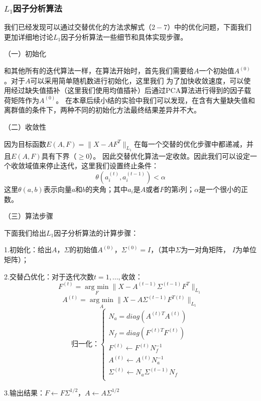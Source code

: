 \subsubsection{$L_1$因子分析算法}
我们已经发现可以通过交替优化的方法求解式（$2-7$）中的优化问题，下面我们更加详细地讨论$L_1$因子分析算法一些细节和具体实现步骤。

（一）初始化

和其他所有的迭代算法一样，在算法开始时，首先我们需要给$A$一个初始值$A^{(0)}$。对于$A$可以采用简单随机数进行初始化，这里我们
为了加快收敛速度，可以使用经过缺失值插补（这里我们使用均值插补）后通过PCA算法进行得到的因子载荷矩阵作为$A^{(0)}$。
在本章后续小结的实验中我们可以发现，在含有大量缺失值和离群值的条件下，两种不同的初始化方法最终结果差异并不大。

（二）收敛性

因为目标函数$E(A, F) = \|X - AF^T\|_{L_1}$在每一个交替的优化步骤中都递减，并且$E(A,F)$具有下界（$\geq 0$）。
因此交替优化算法一定收敛。因此我们可以设定一个收敛域值来停止迭代，这里我们设置终止条件：
    $$ \theta(a_i^{(t)}, a_i^{(t-1)}) <  \alpha $$
这里$\theta(a, b)$表示向量$a$和$b$的夹角；其中$a_i$是$A$或者$F$的第i列；$\alpha$是一个很小的正数。

（三）算法步骤

下面我们给出$L_1$因子分析算法的计算步骤：

1.初始化：给出$A$，$\Sigma$的初始值$A^{(0)}$，$\Sigma^{(0)} = I$，（其中$\Sigma$为一对角矩阵，
$I$为单位矩阵）；

2.交替凸优化：对于迭代次数$t = 1, ..., $收敛：
$$F^{(t)} = \underset{F}{\operatorname{arg\ min}} \|X - A^{(t-1)}\Sigma^{(t-1)}F^{T}\|_{L_1}$$
$$A^{(t)} = \underset{A}{\operatorname{arg\ min}} \|X - A\Sigma^{(t-1)}F^{T(t)} \|_{L_1}$$
\begin{equation*}
    \text{归一化：}\left\{
                 \begin{array}{clr}
                 N_a = diag(A^{(t)T}A^{(t)})\\
                 N_f = diag(F^{(t)T}F^{(t)})\\
                 F^{(t)} \leftarrow F^{(t)}N_f^{-1}\\
                 A^{(t)}\leftarrow A^{(t)}N_a^{-1}\\
                 \Sigma^{(t)} \leftarrow N_a\Sigma^{(t-1)}N_f\\
                 \end{array}
    \right.
\end{equation*}

3.输出结果：$F \leftarrow F\Sigma^{1/2}$，$A \leftarrow A\Sigma^{1/2}$

